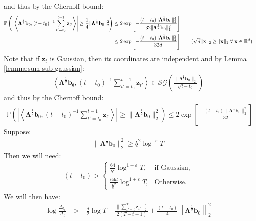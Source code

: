 \documentclass{article}
\newcommand{\sforall}{\;\forall\;}
\renewcommand{\Pr}{\mathbb{P}}
\begin{document}
and thus by the Chernoff bound:
\begin{align*}
    \Pr\left(\left|\left\langle\pmb{\Lambda}^{\frac{1}{2}}\mathbf{b}_0, (t-t_0)^{-1}\sum_{t'=t_0}^{t-1}\mathbf{z}_{t'} \right\rangle\right| \geq \frac{1}{4}\lVert\pmb{\Lambda}^{\frac{1}{2}} \mathbf{b}_0\rVert_2^2\right) &\leq 2\exp\left[-\frac{(t-t_0)\lVert\pmb{\Lambda}^{\frac{1}{2}} \mathbf{b}_0\rVert^4_2}{32\lVert\pmb{\Lambda}^{\frac{1}{2}} \mathbf{b}_0\rVert^2_1}\right] \\
    &\leq 2\exp\left[-\frac{(t-t_0)\lVert\pmb{\Lambda}^{\frac{1}{2}} \mathbf{b}_0\rVert^2_2}{32d}\right] \tag{$\sqrt{d}\lVert \mathbf{x} \rVert_2 \geq \lVert \mathbf{x} \rVert_1 \sforall \mathbf{x} \in\mathbb{R}^d$}
\end{align*}
Note that if $\mathbf{z}_t$ is Gaussian, then its coordinates are independent and by Lemma \ref{lemma:sum-sub-gaussian}:
\begin{align*}
     \left\langle\pmb{\Lambda}^{\frac{1}{2}}\mathbf{b}_0, (t-t_0)^{-1}\sum_{t'=t_0}^{t-1}\mathbf{z}_{t'} \right\rangle \in \mathcal{SG}\left(\frac{\lVert\pmb{\Lambda}^{\frac{1}{2}} \mathbf{b}_0\rVert_2}{\sqrt{t-t_0}}\right)
\end{align*} 
and thus by the Chernoff bound:
\begin{align*}
    \Pr\left(\left|\left\langle\pmb{\Lambda}^{\frac{1}{2}}\mathbf{b}_0, (t-t_0)^{-1}\sum_{t'=t_0}^{t-1}\mathbf{z}_{t'} \right\rangle\right| \geq \lVert\pmb{\Lambda}^{\frac{1}{2}} \mathbf{b}_0\rVert_2^2\right) \leq 2\exp\left[-\frac{(t-t_0)\lVert\pmb{\Lambda}^{\frac{1}{2}} \mathbf{b}_0\rVert^2_2}{32}\right]
\end{align*}
Suppose:
\begin{align*}
    \lVert\pmb{\Lambda}^{\frac{1}{2}} \mathbf{b}_0\rVert^2_2 \geq \underline{b}^2 \log^{-\varepsilon} T
\end{align*}
Then we will need:
\begin{align*}
    (t-t_0) > 
    \begin{cases}
        \frac{64}{\underline{b}^2} \log^{1+\varepsilon} T, & \text{if Gaussian}, \\
        \frac{64d}{\underline{b}^2} \log^{1+\varepsilon} T, & \text{Otherwise}.
    \end{cases}
\end{align*}
We will then have:
\begin{align*}
    \log \frac{\Delta_{t_0}}{\Delta_t} 
    &> -\frac{d}{2} \log T - \frac{\lVert\sum_{t'=t}^T\mathbf{z}_{t'}\rVert_2^2}{2(T-t+1)} + \frac{(t - t_0)}{4} \left\lVert\pmb{\Lambda}^{\frac{1}{2}}\mathbf{b}_0\right\rVert_2^2
\end{align*}
\end{document}

